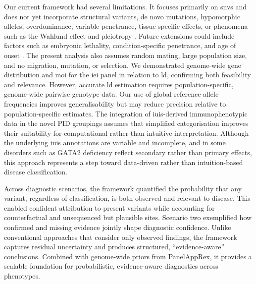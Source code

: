 Our current framework had several limitations. It focuses primarily on \ac{snv}s and does not yet incorporate structural variants, de novo mutations, hypomorphic alleles, overdominance, variable penetrance, tissue-specific effects, or phenomena such as the Wahlund effect and pleiotropy \cite{zschocke_mendelian_2023}. Future extensions could include factors such as embryonic lethality, condition-specific penetrance, and age of onset \cite{hannah_using_2024}. The present analysis also assumes random mating, large population size, and no migration, mutation, or selection.  
We demonstrated genome-wide gene distribution and \ac{moi} for the \ac{iei} panel in relation to \ac{ld}, confirming both feasibility and relevance. However, accurate \ac{ld} estimation requires population-specific, genome-wide pairwise genotype data. Our use of global reference allele frequencies improves generalisability but may reduce precision relative to population-specific estimates.
The integration of \ac{iuis}-derived immunophenotypic data in the novel PID groupings assumes that simplified categorisation improves their suitability for computational rather than intuitive interpretation. Although the underlying \ac{iuis} annotations are variable and incomplete, and in some disorders such as GATA2 deficiency reflect secondary rather than primary effects, this approach represents a step toward data-driven rather than intuition-based disease classification.

Across diagnostic scenarios, the framework quantified the probability that any variant, regardless of classification, is both observed and relevant to disease. This enabled confident attribution to present variants while accounting for counterfactual and unsequenced but plausible sites. Scenario two exemplified how confirmed and missing evidence jointly shape diagnostic confidence. Unlike conventional approaches that consider only observed findings, the framework captures residual uncertainty and produces structured, ``evidence-aware'' conclusions. Combined with genome-wide priors from PanelAppRex, it provides a scalable foundation for probabilistic, evidence-aware diagnostics across phenotypes.



